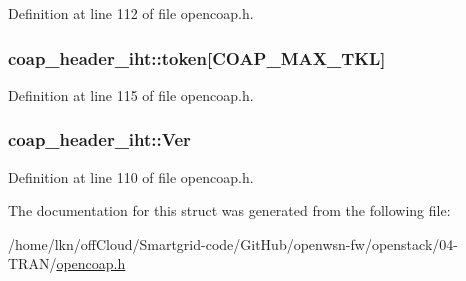 Definition at line 112 of file opencoap.\+h.

\subsubsection[{\texorpdfstring{token}{token}}]{ coap\+\_\+header\+\_\+iht\+::token\mbox{[}{\bf C\+O\+A\+P\+\_\+\+M\+A\+X\+\_\+\+T\+KL}\mbox{]}}\hypertarget{structcoap__header__iht_a68bba3927a3956bd222e063dc156c8ef}{}\label{structcoap__header__iht_a68bba3927a3956bd222e063dc156c8ef}


Definition at line 115 of file opencoap.\+h.

\subsubsection[{\texorpdfstring{Ver}{Ver}}]{ coap\+\_\+header\+\_\+iht\+::\+Ver}\hypertarget{structcoap__header__iht_a7c91ec54c6613ffc3dafd1a0a2ebff98}{}\label{structcoap__header__iht_a7c91ec54c6613ffc3dafd1a0a2ebff98}


Definition at line 110 of file opencoap.\+h.



The documentation for this struct was generated from the following file\+:\begin{DoxyCompactItemize}
\item 
/home/lkn/off\+Cloud/\+Smartgrid-\/code/\+Git\+Hub/openwsn-\/fw/openstack/04-\/\+T\+R\+A\+N/\hyperlink{opencoap_8h}{opencoap.\+h}\end{DoxyCompactItemize}
